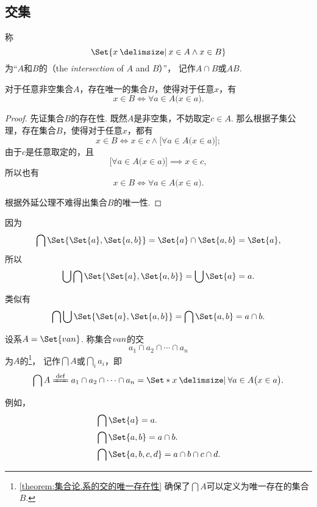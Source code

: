 \subsection{交集}

\begin{definition}
称\[
	\Set{ x \given x \in A \land x \in B }
\]为“\(A\)和\(B\)的（the \emph{intersection} of \(A\) and \(B\)）”，
记作\(A \cap B\)或\(AB\).
\end{definition}

\begin{theorem}\label{theorem:集合论.系的交的唯一存在性}
对于任意非空集合\(A\)，存在唯一的集合\(B\)，使得对于任意\(x\)，有\[
	x \in B
	\iff
	\forall a \in A \bigl( x \in a \bigr).
\]
\begin{proof}
先证集合\(B\)的存在性.
既然\(A\)是非空集，不妨取定\(c \in A\).
那么根据子集公理，存在集合\(B\)，使得对于任意\(x\)，都有\[
	x \in B
	\iff x \in c \land \bigl[ \forall a \in A \bigl( x \in a \bigr) \bigr];
\]
由于\(c\)是任意取定的，且\[
	\bigl[ \forall a \in A \bigl( x \in a \bigr) \bigr]
	\implies
	x \in c,
\]
所以也有\[
	x \in B
	\iff \forall a \in A \bigl( x \in a \bigr).
\]

根据外延公理不难得出集合\(B\)的唯一性.
\end{proof}
\end{theorem}

\begin{example}
因为\[
	\bigcap\Set{\Set{a},\Set{a,b}}
	= \Set{a}\cap\Set{a,b}
	= \Set{a},
\]
所以\[
	\bigcup\bigcap\Set{\Set{a},\Set{a,b}}
	= \bigcup\Set{a}
	= a.
\]

类似有\[
	\bigcap\bigcup\Set{\Set{a},\Set{a,b}}
	= \bigcap\Set{a,b}
	= a \cap b.
\]
\end{example}

\begin{definition}
设系\(A = \Set{\v{a}{n}}\).
称集合\(v{a}{n}\)的交\[
	a_1 \cap a_2 \cap \dotsb \cap a_n
\]为\(A\)的\footnote{%
\cref{theorem:集合论.系的交的唯一存在性} 确保了\(\bigcap A\)可以定义为唯一存在的集合\(B\).
}，%
记作\(\bigcap A\)或\(\bigcap\limits_i a_i\)，即\[
	\bigcap A
	\defeq
	a_1 \cap a_2 \cap \dotsb \cap a_n
	= \Set*{ x \given \forall a \in A \bigl(x \in a\bigr) }.
\]
\end{definition}

例如，
\begin{align*}
	&\bigcap\Set{a} = a. \\
	&\bigcap\Set{a,b} = a \cap b. \\
	&\bigcap\Set{a,b,c,d} = a \cap b \cap c \cap d.
\end{align*}

